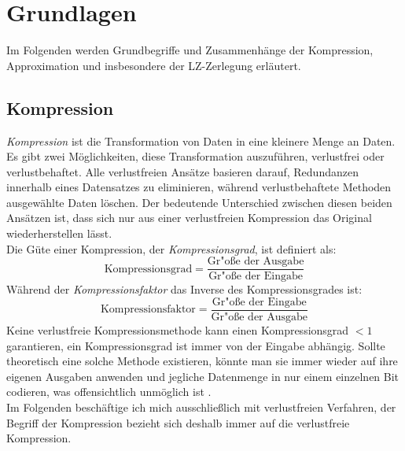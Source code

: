 \chapter{Grundlagen }


Im Folgenden werden Grundbegriffe und Zusammenhänge der Kompression, Approximation und insbesondere der LZ-Zerlegung erläutert.

\section{Kompression}

\emph{Kompression} ist die Transformation von Daten in eine kleinere Menge an Daten.
Es gibt zwei Möglichkeiten, diese Transformation auszuführen, verlustfrei oder verlustbehaftet.
Alle verlustfreien Ansätze basieren darauf, Redundanzen innerhalb eines Datensatzes zu eliminieren, während verlustbehaftete Methoden ausgewählte Daten löschen.
Der bedeutende Unterschied zwischen diesen beiden Ansätzen ist, dass sich nur aus einer verlustfreien Kompression das Original wiederherstellen lässt.\\
Die Güte einer Kompression, der \emph{Kompressionsgrad}, ist definiert als:
\begin{equation}
\text{Kompressionsgrad} =\frac{\text{Gr"o\ss e der Ausgabe}}{\text{Gr"o\ss e der Eingabe}}
\end{equation}
Während der \emph{Kompressionsfaktor} das Inverse des Kompressionsgrades ist:
\begin{equation}
\text{Kompressionsfaktor} =\frac{\text{Gr"o\ss e der Eingabe}}{\text{Gr"o\ss e der Ausgabe}}
\end{equation}
Keine verlustfreie Kompressionsmethode kann einen Kompressionsgrad $<1$ garantieren, ein Kompressionsgrad ist immer von der Eingabe abhängig. Sollte theoretisch eine solche Methode existieren, könnte man sie immer wieder auf ihre eigenen Ausgaben anwenden und jegliche Datenmenge in nur einem einzelnen Bit codieren, was offensichtlich unmöglich ist \cite{compressreff}.\\
Im Folgenden beschäftige ich mich ausschließlich mit verlustfreien Verfahren, der Begriff der Kompression bezieht sich deshalb immer auf die verlustfreie Kompression.

\newpage
